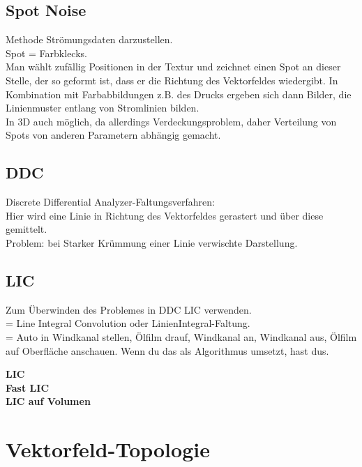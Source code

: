 \documentclass{article}
\begin{document}
\subsection{Spot Noise}
Methode Strömungsdaten darzustellen.\\
Spot = Farbklecks.\\
Man wählt zufällig Positionen in der Textur und zeichnet einen Spot an dieser Stelle, der so geformt ist, dass er die Richtung des Vektorfeldes wiedergibt. In Kombination mit Farbabbildungen z.B. des Drucks ergeben sich dann Bilder, die Linienmuster entlang von Stromlinien bilden.\\

\noindent In 3D auch möglich, da allerdings Verdeckungsproblem, daher Verteilung von Spots von anderen Parametern abhängig gemacht.\\

\subsection{DDC}

\noindent Discrete Differential Analyzer-Faltungsverfahren:\\
Hier wird eine Linie in Richtung des Vektorfeldes gerastert und über diese gemittelt.\\
Problem: bei Starker Krümmung einer Linie verwischte Darstellung. \\


\subsection{LIC}
Zum Überwinden des Problemes in DDC LIC verwenden.\\
= Line Integral Convolution oder LinienIntegral-Faltung.\\
= Auto in Windkanal stellen, Ölfilm drauf, Windkanal an, Windkanal aus, Ölfilm auf Oberfläche anschauen. Wenn du das als Algorithmus umsetzt, hast dus. 

\noindent \textbf{LIC}\\

\noindent \textbf{Fast LIC}\\

\noindent \textbf{LIC auf Volumen}

\pagebreak
\section{Vektorfeld-Topologie}
\end{document}
